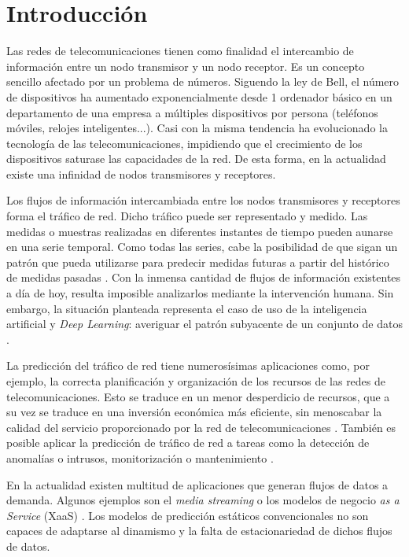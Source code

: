\chapter{Introducción}
\label{cap1:intro}
Las redes de telecomunicaciones tienen como finalidad el intercambio de información entre un nodo transmisor y un nodo receptor. Es un concepto sencillo afectado por un problema de números. Siguendo la ley de Bell, el número de dispositivos ha aumentado exponencialmente desde 1 ordenador básico en un departamento de una empresa a múltiples dispositivos por persona (teléfonos móviles, relojes inteligentes...)\cite{bell2008}. Casi con la misma tendencia ha evolucionado la tecnología de las telecomunicaciones, impidiendo que el crecimiento de los dispositivos saturase las capacidades de la red. De esta forma, en la actualidad existe una infinidad de nodos transmisores y receptores.

Los flujos de información intercambiada entre los nodos transmisores y receptores forma el tráfico de red. Dicho tráfico puede ser representado y medido. Las medidas o muestras realizadas en diferentes instantes de tiempo pueden aunarse en una serie temporal. Como todas las series, cabe la posibilidad de que sigan un patrón que pueda utilizarse para predecir medidas futuras a partir del histórico de medidas pasadas \cite{azzouni2017}. Con la inmensa cantidad de flujos de información existentes a día de hoy, resulta imposible analizarlos mediante la intervención humana. Sin embargo, la situación planteada representa el caso de uso de la inteligencia artificial y \textit{Deep Learning}: averiguar el patrón subyacente de un conjunto de datos \cite{validationsource}.

La predicción del tráfico de red tiene numerosísimas aplicaciones como, por ejemplo, la correcta planificación y organización de los recursos de las redes de telecomunicaciones. Esto se traduce en un menor desperdicio de recursos, que a su vez se traduce en una inversión económica más eficiente, sin menoscabar la calidad del servicio proporcionado por la red de telecomunicaciones \cite{bui2017}. También es posible aplicar la predicción de tráfico de red a tareas como la detección de anomalías o intrusos, monitorización o mantenimiento \cite{guo2016robust}.

En la actualidad existen multitud de aplicaciones que generan flujos de datos a demanda. Algunos ejemplos son el \textit{media streaming} o los modelos de negocio \textit{as a Service} (XaaS) \cite{duan2015xaas}. Los modelos de predicción estáticos convencionales no son capaces de adaptarse al dinamismo y la falta de estacionariedad de dichos flujos de datos.

